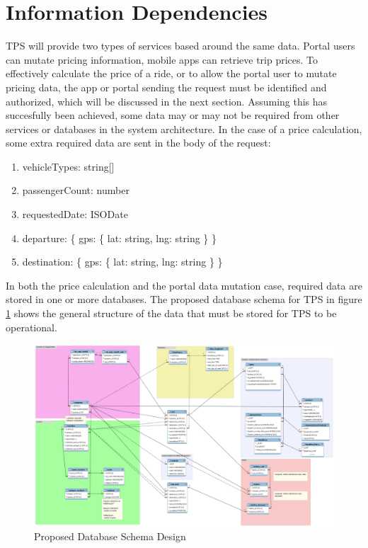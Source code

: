 \section{Information Dependencies}
TPS will provide two types of services based around the same data. Portal users can mutate pricing information, mobile apps can retrieve trip prices. To effectively calculate the price of a ride, or to allow the portal user to mutate pricing data, the app or portal sending the request must be identified and authorized, which will be discussed in the next section. Assuming this has succesfully been achieved, some data may or may not be required from other services or databases in the system architecture. In the case of a price calculation, some extra required data are sent in the body of the request:

\begin{enumerate}
	\item vehicleTypes: string[]
	\item passengerCount: number
	\item requestedDate: ISODate
	\item departure: \{ gps: \{ lat: string, lng: string \} \}
	\item destination: \{ gps: \{ lat: string, lng: string \} \}
\end{enumerate}

In both the price calculation and the portal data mutation case, required data are stored in one or more databases. The proposed database schema for TPS in figure \ref{fig:Schema} shows the general structure of the data that must be stored for TPS to be operational.

\begin{figure}[ht!]
	\centering
	\includegraphics[width=1\textwidth]{Schema}
	\caption[Schema]{Proposed Database Schema Design}
	\label{fig:Schema}
\end{figure}

